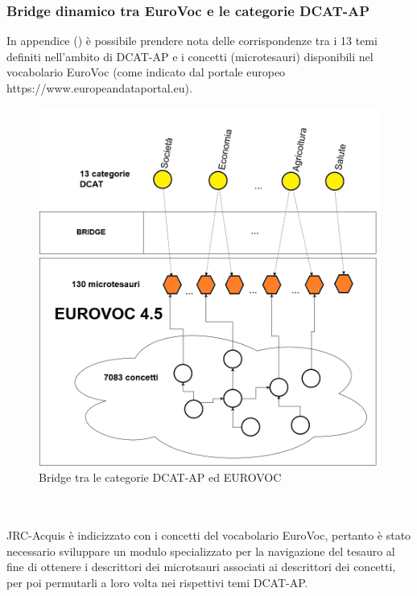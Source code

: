 \documentclass{article}
\theoremstyle{plain}
\theoremstyle{definition}
\begin{document}
\subsubsection{Bridge dinamico tra EuroVoc e le categorie DCAT-AP}
In appendice () è possibile prendere nota delle corrispondenze tra i 13 temi definiti nell'ambito di DCAT-AP e i concetti (microtesauri) disponibili nel vocabolario EuroVoc (come indicato dal portale europeo https://www.europeandataportal.eu).
\begin{figure}[htbp]
\begin{center}
\includegraphics[scale=0.50]{img/eurovocdcat.png}
\caption{Bridge tra le categorie DCAT-AP ed EUROVOC}
\end{center}
\end{figure}
\\
\\
JRC-Acquis è indicizzato con i concetti del vocabolario EuroVoc, pertanto è stato necessario sviluppare un modulo specializzato per la navigazione del tesauro al fine di ottenere i descrittori dei microtsauri associati ai descrittori dei concetti, per poi permutarli a loro volta nei rispettivi temi DCAT-AP.
\end{document}
